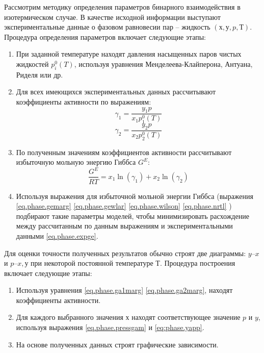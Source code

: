 Рассмотрим методику определения параметров бинарного взаимодействия в изотермическом случае. В качестве исходной информации выступают экспериментальные данные о фазовом равновесии пар – жидкость $(х, у, p, Т)$. Процедура определения параметров включает следующие этапы:
\begin{enumerate}
	\item При заданной температуре находят давления насыщенных паров чистых жидкостей $p_i^0(T)$, используя уравнения Менделеева-Клайперона, Антуана, Риделя или др.
	\item Для всех имеющихся экспериментальных данных рассчитывают коэффициенты активности по выражениям:
	\begin{equation}
		\gamma_1=\dfrac{y_1 p}{x_1 p_1^0(T)}
	\end{equation}
	\begin{equation}
		\gamma_2=\dfrac{y_2 p}{x_2 p_2^0(T)}
	\end{equation}
	\item По полученным значениям коэффициентов активности рассчитывают избыточную мольную энергию Гиббса $G^E$:
	\begin{equation}\label{eq.phase.expge}
		\dfrac{G^E}{RT}=x_1 \ln(\gamma_1)+x_2 \ln(\gamma_2)
	\end{equation}
	\item Используя  выражения для избыточной мольной энергии Гиббса (выражения \eqref{eq.phase.gemarg} \eqref{eq.phase.gewlar} \eqref{eq.phase.wilson} \eqref{eq.phase.nrtl} ) подбирают такие параметры моделей, чтобы минимизировать расхождение между рассчитанным по данным выражениям и экспериментальными данными \eqref{eq.phase.expge}.
\end{enumerate}

Для оценки точности полученных результатов обычно строят две диаграммы: $y – x$ и $p – x, у$ при некоторой постоянной температуре $Т$. Процедура построения включает следующие этапы:
\begin{enumerate}
\item Используя уравнения \eqref{eq.phase.ga1marg} \eqref{eq.phase.ga2marg}, находят коэффициенты активности.
\item Для каждого выбранного значения х находят соответствующее значение $p$ и $y$, используя выражения \eqref{eq.phase.pressgam} и \eqref{eq:phase.yapp}.
\item На основе полученных данных строят графические зависимости.
\end{enumerate}

